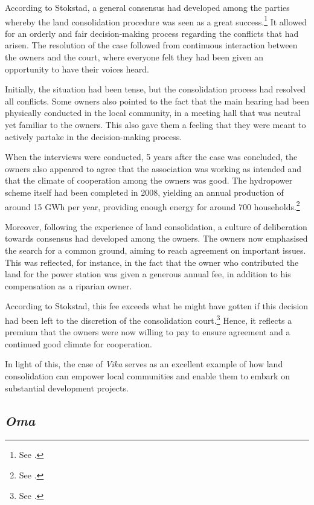 According to Stokstad, a general consensus had developed among the parties whereby the land consolidation procedure was seen as a great success.\footnote{See \cite[39-41]{stokstad11}.} It allowed for an orderly and fair decision-making process regarding the conflicts that had arisen. The resolution of the case followed from continuous interaction between the owners and the court, where everyone felt they had been given an opportunity to have their voices heard. 

Initially, the situation had been tense, but the consolidation process had resolved all conflicts. Some owners also pointed to the fact that the main hearing had been physically conducted in the local community, in a meeting hall that was neutral yet familiar to the owners. This also gave them a feeling that they were meant to actively partake in the decision-making process. 

When the interviews were conducted, 5 years after the case was concluded, the owners also appeared to agree that the association was working as intended and that the climate of cooperation among the owners was good. The hydropower scheme itself had been completed in 2008, yielding an annual production of around 15 GWh per year, providing enough energy for around 700 households.\footnote{See \cite[41]{stokstad11}.}

Moreover, following the experience of land consolidation, a culture of deliberation towards consensus had developed among the owners. The owners now emphasised the search for a common ground, aiming to reach agreement on important issues. This was reflected, for instance, in the fact that the owner who contributed the land for the power station was given a generous annual fee, in addition to his compensation as a riparian owner.

According to Stokstad, this fee exceeds what he might have gotten if this decision had been left to the discretion of the consolidation court.\footnote{See \cite[40]{stokstad11}.} Hence, it reflects a premium that the owners were now willing to pay to ensure agreement and a continued good climate for cooperation.

In light of this, the case of \emph{Vika} serves as an excellent example of how land consolidation can empower local communities and enable them to embark on substantial development projects.

\subsection{\emph{Oma}}\label{sec:6:4:2}


